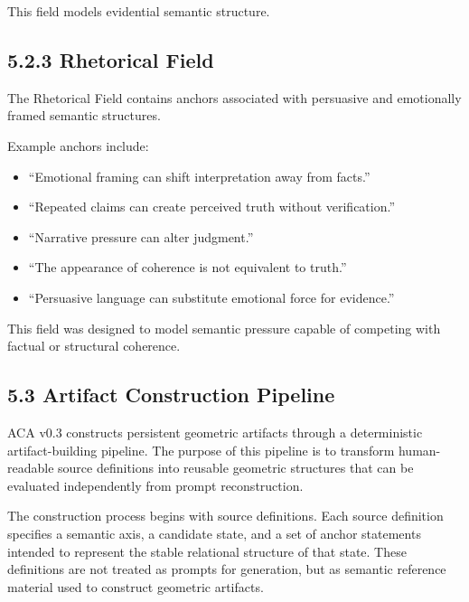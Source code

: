 \documentclass[11pt]{article}
\begin{document}
This field models evidential semantic structure.

\subsection{5.2.3 Rhetorical Field}

The Rhetorical Field contains anchors associated with persuasive and emotionally framed semantic structures.

Example anchors include:

\begin{itemize}
\item ``Emotional framing can shift interpretation away from facts.''
\end{itemize}
\begin{itemize}
\item ``Repeated claims can create perceived truth without verification.''
\end{itemize}
\begin{itemize}
\item ``Narrative pressure can alter judgment.''
\end{itemize}
\begin{itemize}
\item ``The appearance of coherence is not equivalent to truth.''
\end{itemize}
\begin{itemize}
\item ``Persuasive language can substitute emotional force for evidence.''
\end{itemize}

This field was designed to model semantic pressure capable of competing with factual or structural coherence.

\subsection{5.3 Artifact Construction Pipeline}

ACA v0.3 constructs persistent geometric artifacts through a deterministic artifact-building pipeline. The purpose of this pipeline is to transform human-readable source definitions into reusable geometric structures that can be evaluated independently from prompt reconstruction.

The construction process begins with source definitions. Each source definition specifies a semantic axis, a candidate state, and a set of anchor statements intended to represent the stable relational structure of that state. These definitions are not treated as prompts for generation, but as semantic reference material used to construct geometric artifacts.
\end{document}
